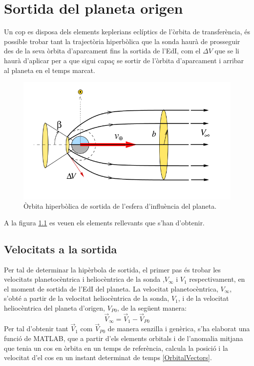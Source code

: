\chapter{Sortida del planeta origen}
Un cop es disposa dels elements keplerians eclíptics de l'òrbita de transferència, és possible trobar tant la trajectòria hiperbòlica que la sonda haurà de prosseguir des de la seva òrbita d'aparcament fins la sortida de l'EdI, com el $\Delta V$ que se li haurà d'aplicar per a que sigui capaç se sortir de l'òrbita d'aparcament i arribar al planeta en el temps marcat.

\begin{figure}[H]
	\centering
	\includegraphics[scale=0.5]{./plots/hyperbola}
	\caption{Òrbita hiperbòlica de sortida de l'esfera d'influència del planeta.}
	\label{esquema_hyperbola}
\end{figure}
A la figura \ref{esquema_hyperbola} es veuen els elements rellevants que s'han d'obtenir.
\section{Velocitats a la sortida}
Per tal de determinar la hipèrbola de sortida, el primer pas és trobar les velocitats planetocèntrica i heliocèntrica de la sonda ,$V_{\infty}$ i $V_1$ respectivament, en el moment de sortida de l'EdI del planeta. La velocitat planetocèntrica, $V_{\infty}$, s'obté a partir de la velocitat heliocèntrica de la sonda, $V_1$, i de la velocitat heliocèntrica del planeta d'origen, $V_{P0}$, de la següent manera:
\begin{equation}
\vec{V}_{\infty} = \vec{V}_{1} - \vec{V}_{P0}
\end{equation}
Per tal d'obtenir tant $\vec{V}_{1}$ com $\vec{V}_{P0}$ de manera senzilla i genèrica, s'ha elaborat una funció de MATLAB, que a partir d'els elements orbitals i de l'anomalia mitjana que tenia un cos en òrbita en un temps de referència, calcula la posició i la velocitat d'el cos en un instant determinat de temps \ref{OrbitalVectors}.

